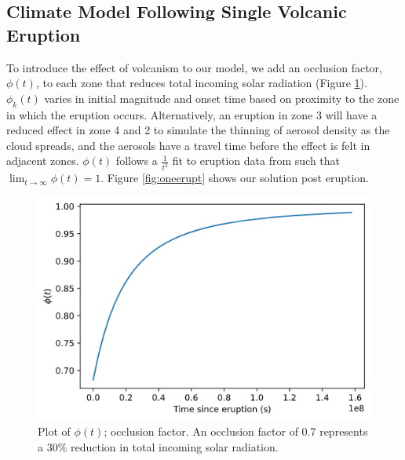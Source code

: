 \documentclass{article}
\begin{document}
\subsection{Climate Model Following Single Volcanic Eruption}
To introduce the effect of volcanism to our model, we add an occlusion factor,
$\phi(t)$, to each zone that reduces total incoming solar radiation
(Figure \ref{fig:occlusion}). $\phi_k(t)$ varies in initial magnitude and onset
time based on proximity to the zone in which the eruption occurs. Alternatively,
an eruption in zone 3 will have a reduced effect in zone 4 and 2 to simulate
the thinning of aerosol density as the cloud spreads, and the aerosols have a
travel time before the effect is felt in adjacent zones. $\phi(t)$ follows a
$\frac{1}{t^2}$ fit to eruption data from \cite{robock} such that
$\lim_{t\to\infty}\phi(t) = 1$.
Figure \ref{fig:oneerupt} shows our solution post eruption. 

\begin{figure}[H]
    \centering
    \includegraphics[scale=0.5]{occlusion.png}
    \caption{
        Plot of $\phi(t)$; occlusion factor. An occlusion factor of 0.7
        represents a $30\%$ reduction in total incoming solar radiation.
    }
    \label{fig:occlusion}
\end{figure}
\FloatBarrier
\end{document}
